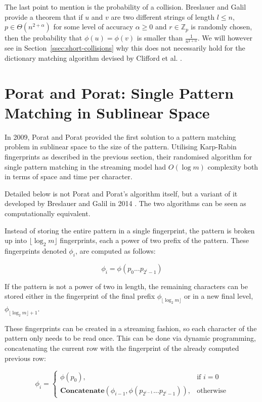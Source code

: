 \documentclass[ %
                    author={Dominic Joseph Moylett},
                    degree={MEng},
                     title={Dictionary Matching with Fingerprints},
                  subtitle={An Empirical Analysis},
                      type={research},
                      year={2015} ]{dissertation}
\begin{document}
The last point to mention is the probability of a collision. Breslauer and Galil \cite{Breslauer:2014:RSS:2660854.2635814} provide a theorem that if $u$ and $v$ are two different strings of length $l \leq n$, $p \in \Theta(n^{2 + \alpha})$ for some level of accuracy $\alpha \geq 0$ and $r \in \mathbb{Z}_p$ is randomly chosen, then the probability that $\phi(u) = \phi(v)$ is smaller than $\frac{1}{n^{1 + \alpha}}$. We will however see in Section~\ref{ssec:short-collisions} why this does not necessarily hold for the dictionary matching algorithm devised by Clifford et al. \cite{2015arXiv150406242C}.

\section{Porat and Porat: Single Pattern Matching in Sublinear Space}
\label{sec:porat-porat}

In 2009, Porat and Porat \cite{5438620} provided the first solution to a pattern matching problem in sublinear space to the size of the pattern. Utilising Karp-Rabin fingerprints as described in the previous section, their randomised algorithm for single pattern matching in the streaming model had $O(\log m)$ complexity both in terms of space and time per character.

Detailed below is not Porat and Porat's algorithm itself, but a variant of it developed by Breslauer and Galil in 2014 \cite{Breslauer:2014:RSS:2660854.2635814}. The two algorithms can be seen as computationally equivalent.

Instead of storing the entire pattern in a single fingerprint, the pattern is broken up into $\lfloor \log_2 m\rfloor$ fingerprints, each a power of two prefix of the pattern. These fingerprints denoted $\phi_i$, are computed as follows:

$$\phi_i = \phi(p_0...p_{2^i-1})$$

If the pattern is not a power of two in length, the remaining characters can be stored either in the fingerprint of the final prefix $\phi_{\lfloor\log_2m\rfloor}$ or in a new final level, $\phi_{\lfloor\log_2m\rfloor + 1}$.

These fingerprints can be created in a streaming fashion, so each character of the pattern only needs to be read once. This can be done via dynamic programming, concatenating the current row with the fingerprint of the already computed previous row:

\[
  \phi_i =
  \begin{cases}
    \phi(p_0),& \text{if } i = 0\\
    \textbf{Concatenate}(\phi_{i - 1}, \phi(p_{2^{i-1}}...p_{2^i-1})),& \text{otherwise}
  \end{cases}
\]
\end{document}

